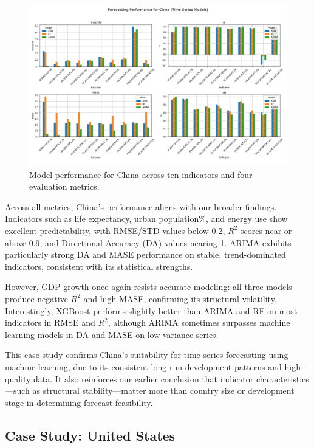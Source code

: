 \documentclass[12pt]{article}
\begin{document}
\begin{figure}[H]
    \centering
    \includegraphics[width=\textwidth]{china_case_comparison.png}
    \caption{Model performance for China across ten indicators and four evaluation metrics.}
    \label{fig:china_ts_metrics}
\end{figure}

Across all metrics, China's performance aligns with our broader findings. Indicators such as life expectancy, urban population\%, and energy use show excellent predictability, with RMSE/STD values below 0.2, $R^2$ scores near or above 0.9, and Directional Accuracy (DA) values nearing 1. ARIMA exhibits particularly strong DA and MASE performance on stable, trend-dominated indicators, consistent with its statistical strengths.

However, GDP growth once again resists accurate modeling: all three models produce negative $R^2$ and high MASE, confirming its structural volatility. Interestingly, XGBoost performs slightly better than ARIMA and RF on most indicators in RMSE and $R^2$, although ARIMA sometimes surpasses machine learning models in DA and MASE on low-variance series.

This case study confirms China's suitability for time-series forecasting using machine learning, due to its consistent long-run development patterns and high-quality data.\cite{zhang2020china, xie2018macroeconomic} It also reinforces our earlier conclusion that indicator characteristics—such as structural stability—matter more than country size or development stage in determining forecast feasibility.
\subsection{Case Study: United States}
\end{document}
